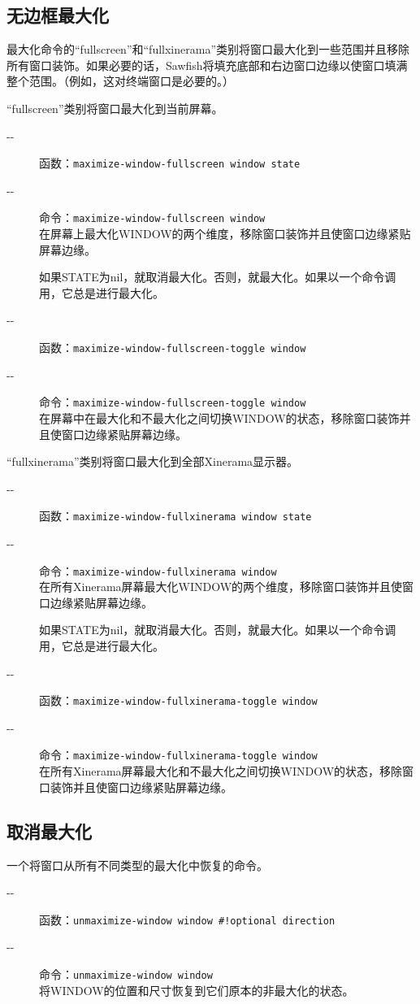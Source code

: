 \documentclass{book}
\begin{document}
\begin{CJK*}{UTF8}{gbsn}
\subsection{无边框最大化}
最大化命令的``fullscreen''和``fullxinerama''类别将窗口最大化到一些范围并且移除所有窗口装饰。如果必要的话，Sawfish将填充底部和右边窗口边缘以使窗口填满整个范围。（例如，这对终端窗口是必要的。）

``fullscreen''类别将窗口最大化到当前屏幕。
\begin{description}
\item[-{}-] 函数：\verb|maximize-window-fullscreen window state|
\item[-{}-] 命令：\verb|maximize-window-fullscreen window|\\
在屏幕上最大化WINDOW的两个维度，移除窗口装饰并且使窗口边缘紧贴屏幕边缘。

如果STATE为nil，就取消最大化。否则，就最大化。如果以一个命令调用，它总是进行最大化。
\item[-{}-] 函数：\verb|maximize-window-fullscreen-toggle window|
\item[-{}-] 命令：\verb|maximize-window-fullscreen-toggle window|\\
在屏幕中在最大化和不最大化之间切换WINDOW的状态，移除窗口装饰并且使窗口边缘紧贴屏幕边缘。
\end{description}

``fullxinerama''类别将窗口最大化到全部Xinerama显示器。
\begin{description}
\item[-{}-] 函数：\verb|maximize-window-fullxinerama window state|
\item[-{}-] 命令：\verb|maximize-window-fullxinerama window|\\
在所有Xinerama屏幕最大化WINDOW的两个维度，移除窗口装饰并且使窗口边缘紧贴屏幕边缘。

如果STATE为nil，就取消最大化。否则，就最大化。如果以一个命令调用，它总是进行最大化。
\item[-{}-] 函数：\verb|maximize-window-fullxinerama-toggle window|
\item[-{}-] 命令：\verb|maximize-window-fullxinerama-toggle window|\\
在所有Xinerama屏幕最大化和不最大化之间切换WINDOW的状态，移除窗口装饰并且使窗口边缘紧贴屏幕边缘。
\end{description}
\subsection{取消最大化}
一个将窗口从所有不同类型的最大化中恢复的命令。
\begin{description}
\item[-{}-] 函数：\verb|unmaximize-window window #!optional direction|
\item[-{}-] 命令：\verb|unmaximize-window window|\\
将WINDOW的位置和尺寸恢复到它们原本的非最大化的状态。


\end{description}
\end{CJK*}
\end{document}
